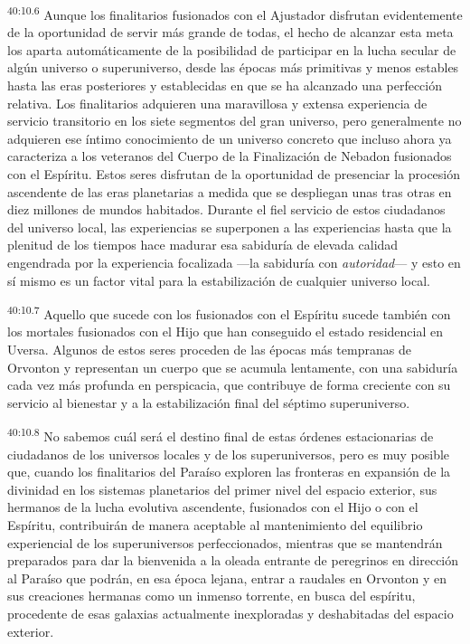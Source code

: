 \par
\textsuperscript{40:10.6} Aunque los finalitarios fusionados con el Ajustador disfrutan evidentemente de la oportunidad de servir más grande de todas, el hecho de alcanzar esta meta los aparta automáticamente de la posibilidad de participar en la lucha secular de algún universo o superuniverso, desde las épocas más primitivas y menos estables hasta las eras posteriores y establecidas en que se ha alcanzado una perfección relativa. Los finalitarios adquieren una maravillosa y extensa experiencia de servicio transitorio en los siete segmentos del gran universo, pero generalmente no adquieren ese íntimo conocimiento de un universo concreto que incluso ahora ya caracteriza a los veteranos del Cuerpo de la Finalización de Nebadon fusionados con el Espíritu. Estos seres disfrutan de la oportunidad de presenciar la procesión ascendente de las eras planetarias a medida que se despliegan unas tras otras en diez millones de mundos habitados. Durante el fiel servicio de estos ciudadanos del universo local, las experiencias se superponen a las experiencias hasta que la plenitud de los tiempos hace madurar esa sabiduría de elevada calidad engendrada por la experiencia focalizada ---la sabiduría con \textit{autoridad}--- y esto en sí mismo es un factor vital para la estabilización de cualquier universo local.

\par
\textsuperscript{40:10.7} Aquello que sucede con los fusionados con el Espíritu sucede también con los mortales fusionados con el Hijo que han conseguido el estado residencial en Uversa. Algunos de estos seres proceden de las épocas más tempranas de Orvonton y representan un cuerpo que se acumula lentamente, con una sabiduría cada vez más profunda en perspicacia, que contribuye de forma creciente con su servicio al bienestar y a la estabilización final del séptimo superuniverso.

\par
\textsuperscript{40:10.8} No sabemos cuál será el destino final de estas órdenes estacionarias de ciudadanos de los universos locales y de los superuniversos, pero es muy posible que, cuando los finalitarios del Paraíso exploren las fronteras en expansión de la divinidad en los sistemas planetarios del primer nivel del espacio exterior, sus hermanos de la lucha evolutiva ascendente, fusionados con el Hijo o con el Espíritu, contribuirán de manera aceptable al mantenimiento del equilibrio experiencial de los superuniversos perfeccionados, mientras que se mantendrán preparados para dar la bienvenida a la oleada entrante de peregrinos en dirección al Paraíso que podrán, en esa época lejana, entrar a raudales en Orvonton y en sus creaciones hermanas como un inmenso torrente, en busca del espíritu, procedente de esas galaxias actualmente inexploradas y deshabitadas del espacio exterior.

